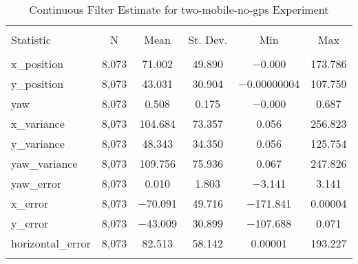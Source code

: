 
\begin{table}[h] \centering 
  \caption{Continuous Filter Estimate for two-mobile-no-gps Experiment} 
  \label{tab:two_mobile_no_gps_continuous_summary} 
\begin{tabular}{@{\extracolsep{5pt}}lccccc} 
\\[-1.8ex]\hline 
\hline \\[-1.8ex] 
Statistic & \multicolumn{1}{c}{N} & \multicolumn{1}{c}{Mean} & \multicolumn{1}{c}{St. Dev.} & \multicolumn{1}{c}{Min} & \multicolumn{1}{c}{Max} \\ 
\hline \\[-1.8ex] 
x\_position & 8,073 & 71.002 & 49.890 & $-$0.000 & 173.786 \\ 
y\_position & 8,073 & 43.031 & 30.904 & $-$0.00000004 & 107.759 \\ 
yaw & 8,073 & 0.508 & 0.175 & $-$0.000 & 0.687 \\ 
x\_variance & 8,073 & 104.684 & 73.357 & 0.056 & 256.823 \\ 
y\_variance & 8,073 & 48.343 & 34.350 & 0.056 & 125.754 \\ 
yaw\_variance & 8,073 & 109.756 & 75.936 & 0.067 & 247.826 \\ 
yaw\_error & 8,073 & 0.010 & 1.803 & $-$3.141 & 3.141 \\ 
x\_error & 8,073 & $-$70.091 & 49.716 & $-$171.841 & 0.00004 \\ 
y\_error & 8,073 & $-$43.009 & 30.899 & $-$107.688 & 0.071 \\ 
horizontal\_error & 8,073 & 82.513 & 58.142 & 0.00001 & 193.227 \\ 
\hline \\[-1.8ex] 
\end{tabular} 
\end{table} 
